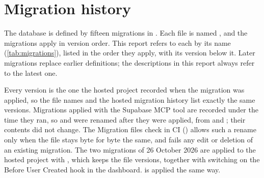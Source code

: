 \chapter{Migration history}
\label{app:migrations}

The database is defined by fifteen migrations in . Each file is named
, and the migrations apply in version order. This report refers to each by its
name (\cref{tab:migrations}), listed in the order they apply, with its version below it. Later migrations
replace earlier definitions; the descriptions in this report always refer to the latest one.

Every version is the one the hosted project recorded when the migration was applied, so the file names
and the hosted migration history list exactly the same versions. Migrations applied with the Supabase MCP
tool are recorded under the time they ran, so  and 
were renamed after they were applied, from  and ; their
contents did not change. The Migration files check in CI () allows such
a rename only when the file stays byte for byte the same, and fails any edit or deletion of an existing
migration. The two migrations of 26 October 2026 are applied to the hosted project with
, which keeps the file versions, together with switching on the Before User
Created hook in the dashboard.  is applied the same way.

